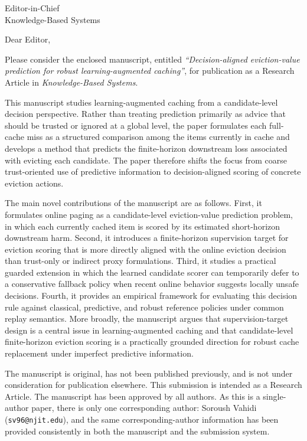 \documentclass[11pt]{letter}
\begin{document}
\begin{letter}{
Editor-in-Chief\\
Knowledge-Based Systems
}

\opening{Dear Editor,}

Please consider the enclosed manuscript, entitled \textit{``Decision-aligned eviction-value prediction for robust learning-augmented caching''}, for publication as a Research Article in \textit{Knowledge-Based Systems}.

This manuscript studies learning-augmented caching from a candidate-level decision perspective. Rather than treating prediction primarily as advice that should be trusted or ignored at a global level, the paper formulates each full-cache miss as a structured comparison among the items currently in cache and develops a method that predicts the finite-horizon downstream loss associated with evicting each candidate. The paper therefore shifts the focus from coarse trust-oriented use of predictive information to decision-aligned scoring of concrete eviction actions.

The main novel contributions of the manuscript are as follows. First, it formulates online paging as a candidate-level eviction-value prediction problem, in which each currently cached item is scored by its estimated short-horizon downstream harm. Second, it introduces a finite-horizon supervision target for eviction scoring that is more directly aligned with the online eviction decision than trust-only or indirect proxy formulations. Third, it studies a practical guarded extension in which the learned candidate scorer can temporarily defer to a conservative fallback policy when recent online behavior suggests locally unsafe decisions. Fourth, it provides an empirical framework for evaluating this decision rule against classical, predictive, and robust reference policies under common replay semantics. More broadly, the manuscript argues that supervision-target design is a central issue in learning-augmented caching and that candidate-level finite-horizon eviction scoring is a practically grounded direction for robust cache replacement under imperfect predictive information.

The manuscript is original, has not been published previously, and is not under consideration for publication elsewhere. This submission is intended as a Research Article. The manuscript has been approved by all authors. As this is a single-author paper, there is only one corresponding author: Soroush Vahidi (\texttt{sv96@njit.edu}), and the same corresponding-author information has been provided consistently in both the manuscript and the submission system.


\end{letter}
\end{document}
